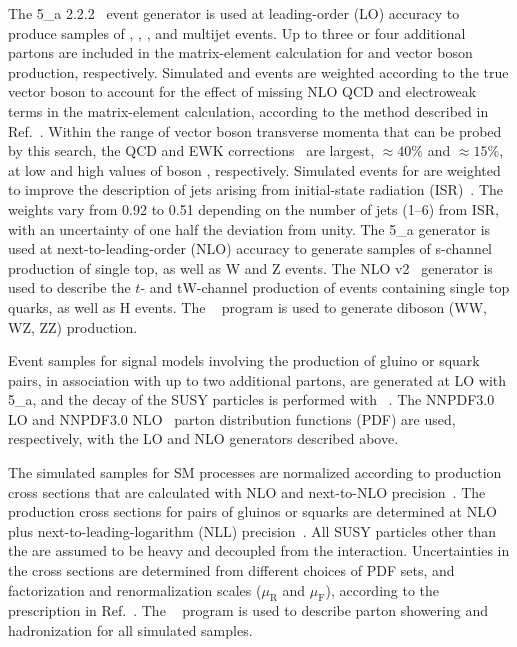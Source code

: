 The {\MADGRAPH{}5\_a\MCATNLO} 2.2.2~\cite{Alwall2014} event generator
is used at leading-order (LO) accuracy to produce samples of \wj, \zj,
\ttbar, and multijet events. Up to three or four additional partons
are included in the matrix-element calculation for \ttbar and
vector boson production, respectively. Simulated \wj and \zj events are
weighted according to the true vector boson \pt %
to account for the effect of missing NLO QCD and electroweak terms in
the matrix-element calculation, according to the method described in
Ref.~\cite{Khachatryan:2016mdm}. Within the range of vector boson
transverse momenta that can be probed by this search, the QCD and EWK
corrections~\cite{Kuhn:2005gv} are largest, ${\approx}40\%$ and
${\approx}15\%$, at low and high values of boson \pt,
respectively. Simulated events for \ttbar are weighted to improve the
description of jets arising from initial-state radiation
(ISR)~\cite{Chatrchyan:2013xna}. The weights vary from 0.92 to 0.51
depending on the number of jets (1--6) from ISR, with an uncertainty
of one half the deviation from unity. The {\MADGRAPH{}5\_a\MCATNLO}
generator is used at next-to-leading-order (NLO) accuracy to generate
samples of s-channel production of single top, as well as {\ttbar}W
and {\ttbar}Z events. The NLO \POWHEG v2~\cite{powheg, powheg_top_Wt}
generator is used to describe the $t$- and tW-channel production of
events containing single top quarks, as well as {\ttbar}H events. The
~\cite{pythia} program is used to generate diboson (WW, WZ,
ZZ) production. 

Event samples for signal models involving the production of gluino or
squark pairs, in association with up to two additional partons, are
generated at LO with {\MADGRAPH{}5\_a\MCATNLO}, and the decay of the
SUSY particles is performed with ~\cite{pythia}. The
\textsc{NNPDF}3.0 LO and \textsc{NNPDF}3.0 NLO~\cite{nnpdf} parton
distribution functions (PDF) are used, respectively, with the LO and
NLO generators described above.

The simulated samples for SM processes are normalized according to
production cross sections that are calculated with NLO and next-to-NLO
precision~\cite{Alwall2014, wphys, fewz, wwxs, top++, nlotop,
  powheg_top_Wt}. The production cross sections for pairs of gluinos
or squarks are determined at NLO plus next-to-leading-logarithm (NLL)
precision~\cite{Beenakker:1996ch, Kulesza:2008jb, Kulesza:2009kq,
  Beenakker:2009ha, Beenakker:2011fu, Borschensky:2014cia}. All SUSY
particles other than the \PSGczDo are assumed to be heavy and
decoupled from the interaction. Uncertainties in the cross sections
are determined from different choices of PDF sets, and factorization
and renormalization scales ($\mu_\text{R}$ and $\mu_\text{F}$),
according to the prescription in Ref.~\cite{Borschensky:2014cia}. The
~\cite{pythia} program is used to describe parton showering
and hadronization for all simulated samples.


